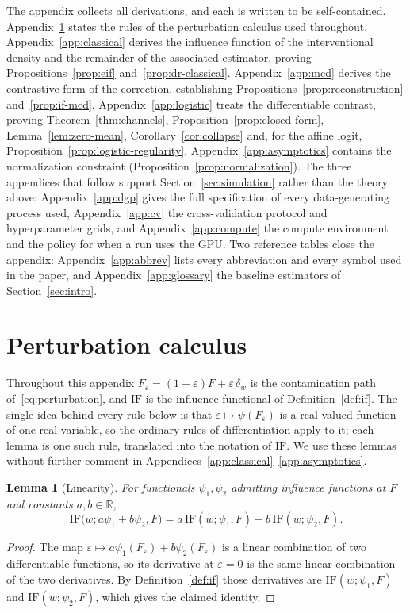 \documentclass[11pt]{article}
\theoremstyle{plain}
\newtheorem{lem}{Lemma}
\theoremstyle{definition}
\theoremstyle{remark}
\newcommand{\R}{\mathbb{R}}
\newcommand{\IF}{\mathrm{IF}}
\begin{document}
The appendix collects all derivations, and each is written to be self-contained.
Appendix~\ref{app:toolbox} states the rules of the perturbation calculus used throughout.
Appendix~\ref{app:classical} derives the influence function of the interventional density and
the remainder of the associated estimator, proving Propositions~\ref{prop:eif}
and~\ref{prop:dr-classical}. Appendix~\ref{app:mcd} derives the contrastive form of the
correction, establishing Propositions~\ref{prop:reconstruction} and~\ref{prop:if-mcd}.
Appendix~\ref{app:logistic} treats the differentiable contrast, proving
Theorem~\ref{thm:channels}, Proposition~\ref{prop:closed-form}, Lemma~\ref{lem:zero-mean},
Corollary~\ref{cor:collapse} and, for the affine logit,
Proposition~\ref{prop:logistic-regularity}. Appendix~\ref{app:asymptotics} contains the normalization
constraint (Proposition~\ref{prop:normalization}). The three appendices that follow support
Section~\ref{sec:simulation} rather than the theory above: Appendix~\ref{app:dgp} gives the full
specification of every data-generating process used, Appendix~\ref{app:cv} the cross-validation
protocol and hyperparameter grids, and Appendix~\ref{app:compute} the compute environment and the
policy for when a run uses the GPU. Two reference tables close the appendix:
Appendix~\ref{app:abbrev} lists every abbreviation and every symbol used in the paper, and
Appendix~\ref{app:glossary} the baseline estimators of Section~\ref{sec:intro}.

\section{Perturbation calculus}
\label{app:toolbox}

Throughout this appendix $F_\varepsilon = (1-\varepsilon)F + \varepsilon\,\delta_w$ is the
contamination path of~\eqref{eq:perturbation}, and $\IF$ is the influence functional of
Definition~\ref{def:if}. The single idea behind every rule below is that
$\varepsilon \mapsto \psi(F_\varepsilon)$ is a real-valued function of one real variable, so
the ordinary rules of differentiation apply to it; each lemma is one such rule, translated into
the notation of $\IF$. We use these lemmas without further comment in
Appendices~\ref{app:classical}--\ref{app:asymptotics}.

\begin{lem}[Linearity]
\label{lem:sum}
For functionals $\psi_1,\psi_2$ admitting influence functions at $F$ and constants
$a,b \in \R$,
\[
\IF\big(w; a\psi_1 + b\psi_2, F\big)
= a\,\IF(w;\psi_1,F) + b\,\IF(w;\psi_2,F).
\]
\end{lem}
\begin{proof}
The map $\varepsilon \mapsto a\psi_1(F_\varepsilon) + b\psi_2(F_\varepsilon)$ is a linear
combination of two differentiable functions, so its derivative at $\varepsilon = 0$ is the
same linear combination of the two derivatives. By Definition~\ref{def:if} those derivatives
are $\IF(w;\psi_1,F)$ and $\IF(w;\psi_2,F)$, which gives the claimed identity.
\end{proof}
\end{document}
